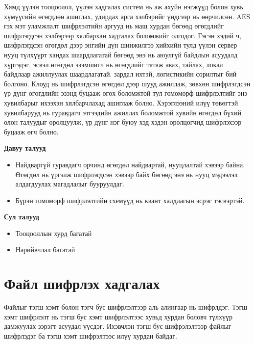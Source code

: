 Хямд үүлэн тооцоолол, үүлэн хадгалах систем нь аж ахуйн нэгжүүд болон хувь хүмүүсийн өгөгдлөө ашиглах, удирдах арга хэлбэрийг үндсээр нь өөрчилсөн. AES гэх мэт уламжлалт шифрлэлтийн аргууд нь маш хурдан бөгөөд өгөгдлийг шифрлэгдсэн хэлбэрээр хялбархан хадгалах боломжийг олгодог. Гэсэн хэдий ч, шифрлэгдсэн өгөгдөл дээр энгийн дүн шинжилгээ хийхийн тулд үүлэн сервер нууц түлхүүрт хандах шаардлагатай бөгөөд энэ нь аюулгүй байдлын асуудалд хүргэдэг, эсвэл өгөгдөл эзэмшигч нь өгөгдлийг татаж авах, тайлах, локал байдлаар ажиллуулах шаардлагатай. зардал ихтэй, логистикийн сорилтыг бий болгоно. Клоуд нь шифрлэгдсэн өгөгдөл дээр шууд ажиллаж, зөвхөн шифрлэгдсэн үр дүнг өгөгдлийн эзэнд буцааж өгөх боломжтой тул гомоморф шифрлэлтийг энэ хувилбарыг ихээхэн хялбарчлахад ашиглаж болно. Хэрэглээний илүү төвөгтэй хувилбарууд нь гуравдагч этгээдийн ажиллах боломжтой хувийн өгөгдөл бүхий олон талуудыг оролцуулж, үр дүнг нэг буюу хэд хэдэн оролцогчид шифрлэхээр буцааж өгч болно.

\textbf{Давуу талууд}
\begin{itemize}
    \item Найдваргүй гуравдагч орчинд өгөгдөл найдвартай, нууцлалтай хэвээр байна. Өгөгдөл нь үргэлж шифрлэгдсэн хэвээр байх бөгөөд энэ нь нууц мэдээлэл алдагдуулах магадлалыг бууруулдаг.
    \item Бүрэн гомоморф шифрлэлтийн схемүүд нь квант халдлагын эсрэг тэсвэртэй.
\end{itemize}

\textbf{Сул талууд}
\begin{itemize}
    \item Тооцооллын хурд багатай 
    \item Нарийвчлал багатай
\end{itemize}

\section{Файл шифрлэх хадгалах}

Файлыг тэгш хэмт болон тэгч бус шифрлэлтээр аль алингаар нь шифрлдэг. Тэгш хэмт шифрлэлт нь тэгш бус хэмт шифрлэлтээс хувьд хурдан боловч түлхүүр дамжуулах зэрэгт асуудал үүсдэг.
Ихэвчлэн тэгш бус шифрэлэлтээр файлыг шифрлэдэг ба тэгш хэмт шифрэлтээс илүү хурдан байдаг.

